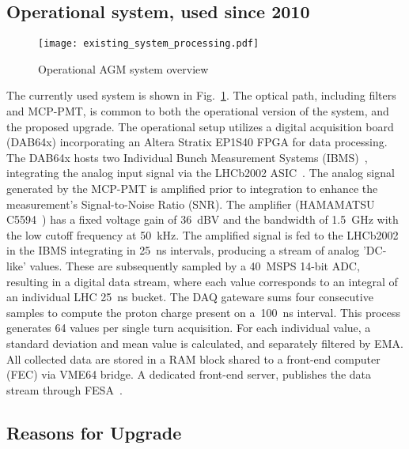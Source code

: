 \subsection{Operational system, used since 2010}
\begin{figure}[!tbh]
    \centering
    \texttt{[image: existing\_system\_processing.pdf]}
    \caption{Operational AGM system overview}
    \label{fig:current_system_processing}
\end{figure}

The currently used system is shown in Fig.~\ref{fig:current_system_processing}.
%
The optical path, including filters and MCP-PMT, is common to both the operational version of the system, and the proposed upgrade.
The operational setup utilizes a digital acquisition board (DAB64x) incorporating an Altera Stratix EP1S40 FPGA for data processing.
%
The DAB64x hosts two Individual Bunch Measurement Systems (IBMS)~\cite{ibms}, integrating the analog input signal via the LHCb2002 ASIC~\cite{lhcb_asic}.
%
The analog signal generated by  the MCP-PMT is amplified  prior to integration to  enhance the measurement's Signal-to-Noise Ratio  (SNR).
%
The amplifier (HAMAMATSU C5594~\cite{bsra_first_operation}) has a fixed voltage gain of \SI{36}{dBV} and the bandwidth of \SI{1.5}{GHz} with the low cutoff frequency at \SI{50}{kHz}.
%
The amplified signal is fed to the LHCb2002 in the IBMS integrating in \SI{25}{\nano\second} intervals, producing a stream of analog  'DC-like' values.
%
These are subsequently sampled by a \SI{40}{MSPS} 14-bit ADC, resulting in a digital data stream, where each value corresponds to an integral of an individual LHC \SI{25}{ns} bucket.
%
The DAQ gateware sums four consecutive samples to compute the
proton charge present on a~\SI{100}{ns} interval.
%
This process generates 64 values per single turn acquisition.
%
For each individual value, a standard deviation and mean value is calculated, and separately filtered by EMA. 
%
All collected data are stored in a RAM block shared to a front-end computer (FEC) via VME64 bridge.
%
A dedicated  front-end  server, publishes the data stream through FESA~\cite{fesa}.


\subsection{Reasons for Upgrade}

